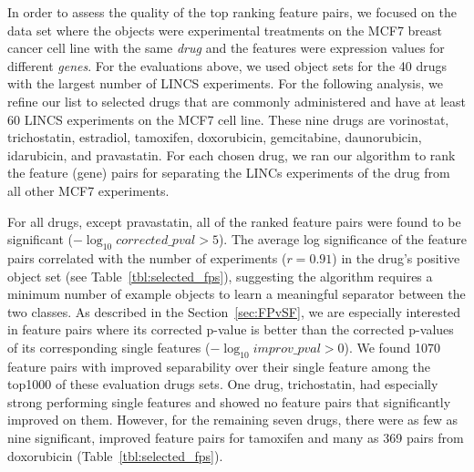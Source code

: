 
 In order to assess the quality of the top ranking feature pairs, we focused on the \lincs data set where the objects were experimental treatments on the MCF7 breast cancer cell line with the same {\em drug} and the features were expression values for different {\em genes}. For the evaluations above, we used object sets for the 40 drugs with the largest number of LINCS experiments. For the following analysis, we refine our list to selected drugs that are commonly administered 
 and have at least 60 LINCS experiments on the MCF7 cell line. These nine drugs are vorinostat, trichostatin, estradiol, tamoxifen, doxorubicin, gemcitabine, daunorubicin, idarubicin, and pravastatin. For each chosen drug, we ran our \sampOpt algorithm to rank the \topthousand feature (gene) pairs for separating the LINCs experiments of the drug from all other MCF7 experiments.

For all drugs, except pravastatin, all of the \topthousand ranked feature pairs were found to be significant ($-\log_{10} corrected\_pval > 5$). The average log significance of the \topthousand feature pairs correlated with the number of experiments ($r=0.91$) in the drug's positive object set (see Table~\ref{tbl:selected_fps}), suggesting the \sampOpt algorithm requires a minimum number of example objects to learn a meaningful separator between the two classes.  As described in the Section~\ref{sec:FPvSF}, we are especially interested in feature pairs where its corrected p-value is better than the corrected p-values of its corresponding single features ($-\log_{10} improv\_pval > 0$). We found 1070 feature pairs with improved separability over their single feature among the top1000 of these evaluation drugs sets. One drug, trichostatin, had especially strong performing single features and showed no feature pairs that significantly improved on them. However, for the remaining seven drugs, there were as few as nine significant, improved feature pairs for tamoxifen and many as 369 pairs from doxorubicin (Table~\ref{tbl:selected_fps}). 

